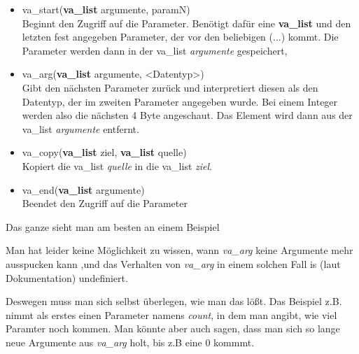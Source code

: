 \documentclass[c_worksheet.tex]{subfiles}
\begin{document}
\begin{itemize}
	\item va\_start(\textbf{va\_list} argumente, paramN) \\
	Beginnt den Zugriff auf die Parameter. Benötigt dafür eine \textbf{va\_list} und den letzten fest angegeben Parameter, der vor den beliebigen (...) kommt. Die Parameter werden dann in der va\_list \emph{argumente} gespeichert,
	\item va\_arg(\textbf{va\_list} argumente, <Datentyp>) \\
	Gibt den nächsten Parameter zurück und interpretiert diesen als den Datentyp, der im zweiten Parameter angegeben wurde. Bei einem Integer werden also die nächsten 4 Byte angeschaut. Das Element wird dann aus der va\_list \emph{argumente} entfernt.
	\item va\_copy(\textbf{va\_list} ziel, \textbf{va\_list} quelle) \\
	Kopiert die va\_list \emph{quelle} in die va\_list \emph{ziel}.
	\item va\_end(\textbf{va\_list} argumente) \\
	Beendet den Zugriff auf die Parameter
\end{itemize}

Das ganze sieht man am besten an einem Beispiel



Man hat leider keine Möglichkeit zu wissen, wann \emph{va\_arg} keine Argumente mehr ausspucken kann ,und das Verhalten von \emph{va\_arg} in einem solchen Fall is (laut Dokumentation) undefiniert.

Deswegen muss man sich selbst überlegen, wie man das lößt. Das Beispiel z.B. nimmt als erstes einen Parameter namens \emph{count}, in dem  man angibt, wie viel Paramter noch kommen. Man könnte aber auch sagen, dass man sich so lange neue Argumente aus \emph{va\_arg} holt, bis z.B eine 0 kommmt.
\end{document}

